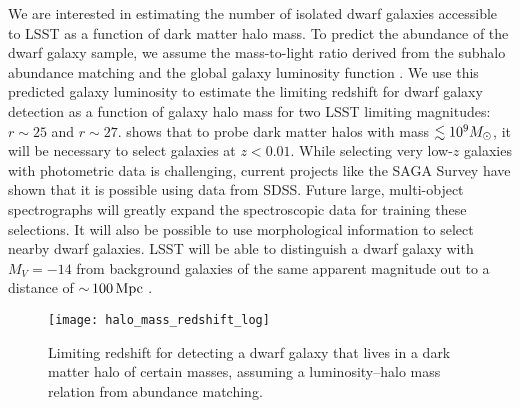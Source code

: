 \vspace{1em} 

We are interested in estimating the number of isolated dwarf galaxies accessible to LSST as a function of dark matter halo mass.
To predict the abundance of the dwarf  galaxy sample, we assume the mass-to-light ratio derived from the subhalo abundance matching and the global galaxy luminosity function \citep{2015MNRAS.451.1540L}.
We use this predicted galaxy luminosity to estimate the limiting redshift for dwarf galaxy detection as a function of galaxy halo mass for two LSST limiting magnitudes: $r \sim 25$ and $r \sim 27$. 
 shows that to probe dark matter halos with mass $\lesssim 10^9 M_\odot$, it will be necessary to select galaxies at $z < 0.01$. 
While selecting very low-$z$ galaxies with photometric data is challenging, current projects like the SAGA Survey \citep{Geha:2017} have shown that it is possible using data from SDSS. 
Future large, multi-object spectrographs will greatly expand the spectroscopic data for training these selections. 
It will also be possible to use morphological information to select nearby dwarf galaxies.
LSST will be able to distinguish a dwarf galaxy with $M_V=-14$ from background galaxies of the same apparent magnitude out to a distance of $ {\sim}\, 100 \mathrm{\,Mpc}$ \citep[Section 9 of][]{0912.0201}.

\begin{figure}
\centering
\texttt{[image: halo\_mass\_redshift\_log]}
\caption{\label{fig:dwarf_redshift} Limiting redshift for detecting a dwarf galaxy that lives in a dark matter halo of certain masses, assuming a luminosity--halo mass relation from abundance matching.}
\end{figure}

\vspace{1em} 

